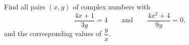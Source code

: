 Find all pairs $(x,y)$ of complex numbers with
\[\dfrac{4x+1}{3y}=4\qquad\text{and}\qquad\dfrac{4x^2+4}{9y}=0,\]
and the corresponding values of $\dfrac yx$.
